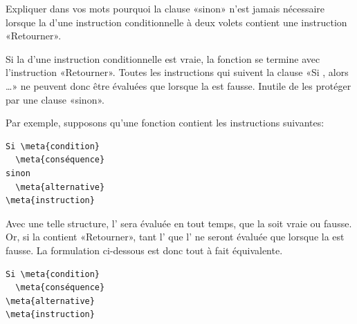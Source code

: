 \begin{exercice}
  Expliquer dans vos mots pourquoi la clause «sinon» n'est jamais
  nécessaire lorsque la  d'une instruction
  conditionnelle à deux volets contient une instruction «Retourner».
  \begin{sol}
    Si la  d'une instruction conditionnelle est
    vraie, la fonction se termine avec l'instruction «Retourner».
    Toutes les instructions qui suivent la clause «Si
    , alors \dots» ne peuvent donc être évaluées que
    lorsque la  est fausse. Inutile de les protéger
    par une clause «sinon».

    Par exemple, supposons qu'une fonction contient les instructions
    suivantes:
    \begin{pseudocode}
\begin{Verbatim}[commandchars=\\\{\}]
Si \meta{condition}
  \meta{conséquence}
sinon
  \meta{alternative}
\meta{instruction}
\end{Verbatim}
    \end{pseudocode}
    Avec une telle structure, l' sera évaluée en
    tout temps, que la  soit vraie ou fausse. Or, si la
     contient «Retourner», tant l'
    que l' ne seront évaluée que lorsque la
     est fausse. La formulation ci-dessous est donc
    tout à fait équivalente.
    \begin{pseudocode}
\begin{Verbatim}[commandchars=\\\{\}]
Si \meta{condition}
  \meta{conséquence}
\meta{alternative}
\meta{instruction}
\end{Verbatim}
    \end{pseudocode}
  \end{sol}
\end{exercice}

